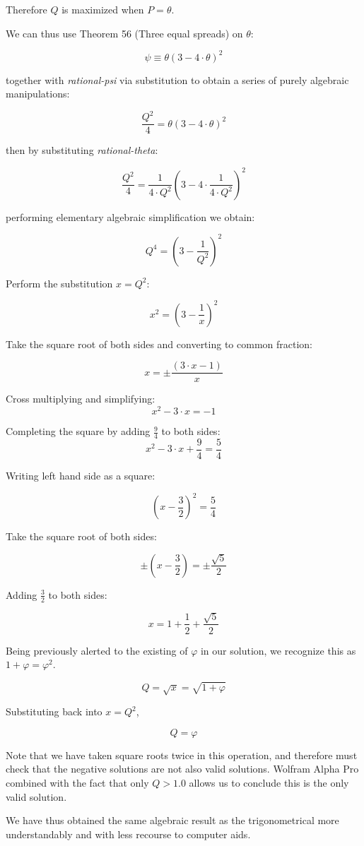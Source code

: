 \documentclass[11pt]{article}
\begin{document}
Therefore $Q$ is maximized when $P = \theta$.

We can thus use Theorem 56 (Three equal spreads) \cite{wildberger2005} on $\theta$:

\[  \psi \equiv \theta (3 - 4 \cdot \theta)^2  \]

together with \textit{rational-psi} via substitution to obtain a series of purely algebraic manipulations:

\[  \frac{Q^2}{4} = \theta (3 - 4 \cdot \theta)^2  \]

then by substituting \textit{rational-theta}:

\[  \frac{Q^2}{4} = \frac{1}{4 \cdot Q^2} (3 - 4 \cdot \frac{1}{4 \cdot Q^2})^2  \]

performing elementary algebraic simplification we obtain:

\[  Q^4 = (3 - \frac{1}{Q^2})^2   \]

Perform the substitution $x = Q^2$:

\[  x^2 = (3 - \frac{1}{x})^2   \]

Take the square root of both sides and converting to common fraction:

\[  x = \pm \frac{(3\cdot x - 1)}{x}   \]

Cross multiplying and simplifying:
\[  x^2 - 3\cdot x =  - 1   \]

Completing the square by adding $\frac{9}{4}$ to both sides:
\[  x^2 - 3\cdot x + \frac{9}{4} =  \frac{5}{4}   \]

Writing left hand side as a square:

\[  (x- \frac{3}{2})^2 =  \frac{5}{4}   \]

Take the square root of both sides:

\[  \pm (x- \frac{3}{2}) =  \pm \frac{\sqrt{5}}{2}   \]

Adding $\frac{3}{2}$ to both sides:

\[  x =   1 + \frac{1}{2} + \frac{\sqrt{5}}{2}   \]

Being previously alerted to the existing of $\varphi$ in our solution, we recognize
this as $1 + \varphi = \varphi^2$. 

\[  Q = \sqrt{x}  =   \sqrt{1 + \varphi}  \]

Substituting back into $x = Q ^ 2$,

\[  Q =   \varphi  \]

Note that we have taken square roots twice in this operation, and therefore must
check that the negative solutions are not also valid solutions. Wolfram Alpha Pro
combined with the fact that only $Q > 1.0$ allows us to conclude this is the
only valid solution.

We have thus obtained the same algebraic result as the trigonometrical more understandably
and with less recourse to computer aids.
\end{document}

